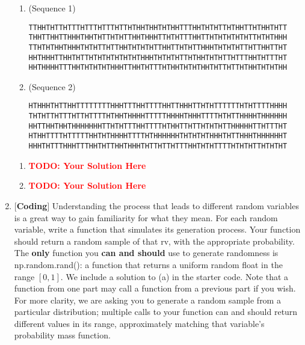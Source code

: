 \documentclass[12pt]{article}
\def\todo#1{\textcolor{red}{\textbf{#1}}}
\renewcommand{\|}{\mid}
\begin{document}
\begin{enumerate}
\begin{enumerate}
    \item (Sequence 1)
    \begin{verbatim}
TTHHTHTTHTTTHTTTHTTTHTTHTHHTHHTHTHHTTTHHTHTHTTHTHHTTHTHHTHTT
THHTTHHTTHHHTHHTHTTHTHTTHHTHHHTTHTHTTTHHTTHTHTHTHTHTTHTHTHHH
TTHTHTHHTHHHTHTHTTHTTHHTHTHTHTTHHTTHTHTTHHHTHTHTHTTHTTHHTTHT
HHTHHHTTHHTHTTHTHTHTHTHTHTHHHTHTHTHTTHTHHTHTHTTHTTTHHTHTTTHT
HHTHHHHTTTHHTHTHTHTHHHTTHHTHTTTHTHHTHTHTHHTHTTHTTHTHHTHTHTHH
\end{verbatim}
    \item (Sequence 2) \begin{verbatim}
HTHHHTHTTHHTTTTTTTTHHHTTTHHTTTTHHTTHHHTTHTHTTTTTTHTHTTTTHHHH
THTHTTHTTTHTTHTTTTHTHHTHHHHTTTTTHHHHTHHHTTTTHTHTTHHHHTHHHHHH
HHTTHHTHHTHHHHHHHTTHTHTTTHHTTTTHTHHTTHTTHTHTHTTHHHHHTTHTTTHT
HTHHTTTTHTTTTTHHTHTHHHHTTTTHTHHHHHHTHTHTHTHHHTHTTHHHTHHHHHHT
HHHTHTTTHHHTTTHHTHTTHHTHHHTHTTHTTHTTTHHTHTHTTTTHTHTHTTHTHTHT
\end{verbatim}
\end{enumerate}

\begin{tcolorbox}
\begin{enumerate}
\item \todo{TODO: Your Solution Here}
\item \todo{TODO: Your Solution Here}
\end{enumerate}
\end{tcolorbox}

\pagebreak
\item \textbf{$[$Coding$]$} Understanding the process that leads to different random variables is a great way to gain
familiarity for what they mean. For each random variable, write a function that simulates its
generation process. Your function should return a random sample of that rv, with the appropriate probability. The \textbf{only} function you \textbf{can and should} use to generate randomness is np.random.rand(): a function that returns a
uniform random float in the range $[0, 1]$. We include a solution to (a) in the starter code.
Note that a function from one part may call a function from a previous part if you wish. For more clarity, we are asking you to generate a random sample from a particular distribution; multiple calls to your function can and should return different values in its range, approximately matching that variable's probability mass function.


\end{enumerate}
\end{document}

